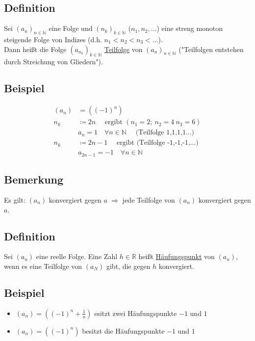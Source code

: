 \documentclass[12pt, titlepage]{article}
\newcommand{\R}{\mathds{R}}
\newcommand{\N}{\mathds{N}}
\renewcommand{\>}{\rightarrow}
\renewcommand{\*}{\cdot}
\begin{document}
	\subsection{Definition}
	Sei $(a_n)_{n\in\N}$ eine Folge und $(n_k)_{k\in\N}$ ($n_1,n_2,...$) eine streng monoton steigende Folge von Indizes (d.h. $n_1<n_2<n_3<...$).\\
	Dann heißt die Folge $(a_{n_k})_{k\in\N}$ \underline{Teilfolge} von $(a_n)_{n\in\N}$ ("Teilfolgen entstehen durch Streichung von Gliedern").
	\subsection{Beispiel}
	\begin{align*}
		(a_n)&=((-1)^n)\\
		n_k&\coloneqq 2n\quad\textrm{ ergibt  }(n_1=2;\ n_2=4\ n_3=6)\\
		&a_n=1\quad\forall n\in\N\quad\textrm{ (Teilfolge 1,1,1,1...)}\\
		n_k&\coloneqq 2n-1\quad\textrm{ ergibt (Teilfolge -1,-1,-1,...)}\\
		&a_{2n-1}=-1\quad\forall n\in\N
	\end{align*}
	\subsection{Bemerkung}
	Es gilt: $(a_n)$ konvergiert gegen $a$ $\Rightarrow$ jede Teilfolge von $(a_n)$ konvergiert gegen $a$.
	\subsection{Definition}
	Sei $(a_n)$ eine reelle Folge.
	Eine Zahl $h\in\R$ heißt \underline{Häufungspunkt} von $(a_n)$, wenn es eine Teilfolge von $(a_N)$ gibt, die gegen $h$ konvergiert.
	\subsection{Beispiel}
	\begin{itemize}
		\item $(a_n)=((-1)^n+\frac{1}{n})$ esitzt zwei Häufungspunkte $-1$ und $1$
		\item $(a_n)=((-1)^n)$ besitzt die Häufungspunkte $-1$ und $1$
	\end{itemize}
\end{document}
